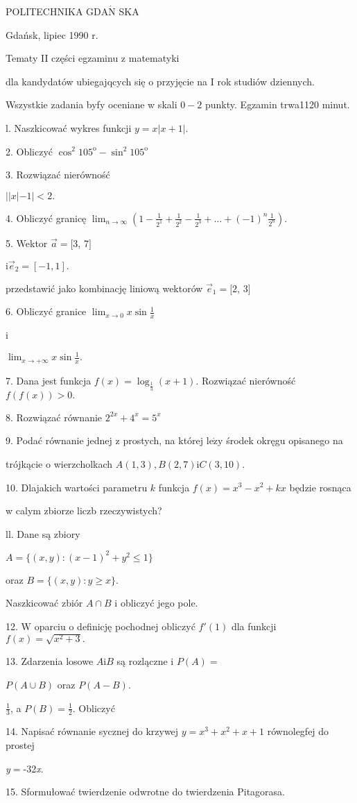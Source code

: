\documentclass[a4paper,12pt]{article}
\begin{document}
POLITECHNIKA $\mathrm{G}\mathrm{D}\mathrm{A}\acute{\mathrm{N}}$ SKA

Gdańsk, lipiec 1990 r.

Tematy II części egzaminu z matematyki

dla kandydatów ubiegajqcych się o przyjęcie na I rok studiów dziennych.

Wszystkie zadania byfy oceniane w skali $0-2$ punkty. Egzamin trwa1120 minut.

l. Naszkicować wykres funkcji $y=x|x+1|.$

2. Obliczyć $\cos^{2}105^{\mathrm{o}}-\sin^{2}105^{\mathrm{o}}$

3. Rozwiązać nierówność

$||x|-1|<2.$

4. Obliczyć granicę $\displaystyle \lim_{n\rightarrow\infty}(1-\frac{1}{2^{1}}+\frac{1}{2^{2}}-\frac{1}{2^{3}}+\ldots+(-1)^{n}\frac{1}{2^{n}}).$

5. Wektor $\vec{a}=[3$, 7$]$

$\mathrm{i}\vec{e}_{2}=[-1,1].$

przedstawić jako kombinację liniową wektorów $\vec{e}_{1}=[2$, 3$]$

6. Obliczyć granice $\displaystyle \lim_{x\rightarrow 0}x\sin\frac{1}{x}$

i

$\displaystyle \lim_{x\rightarrow+\infty}x\sin\frac{1}{x}.$

7. Dana jest funkcja $f(x)=\log_{\frac{1}{3}}(x+1)$. Rozwiązać nierówność $f(f(x))>0.$

8. Rozwiązać równanie $2^{2x}+4^{x}=5^{x}$

9. Podać równanie jednej z prostych, na której $\mathrm{l}\mathrm{e}\dot{\mathrm{z}}\mathrm{y}$ środek okręgu opisanego na

trójkącie o wierzcholkach $A(1,3), B(2,7)\mathrm{i}C(3,10).$

10. Dlajakich wartości parametru $k$ funkcja $f(x)=x^{3}-x^{2}+kx$ będzie rosnąca

w calym zbiorze liczb rzeczywistych?

ll. Dane są zbiory

$A=\{(x,y):(x-1)^{2}+y^{2}\leq 1\}$

oraz $B=\{(x,y):y\geq x\}.$

Naszkicować zbiór $A\cap B$ i obliczyć jego pole.

12. $\mathrm{W}$ oparciu o definicję pochodnej obliczyć $f'(1)$ dla funkcji $f(x)=\sqrt{x^{2}+3}.$

13. Zdarzenia losowe $A \mathrm{i} B$ są rozlączne i $P(A) =$

$P(A\cup B)$ oraz $P(A-B).$

$\displaystyle \frac{1}{3}$, a $P(B) = \displaystyle \frac{1}{2}$. Obliczyć

14. Napisać równanie sycznej do krzywej $y=x^{3}+x^{2}+x+1$ równolegfej do prostej

{\it y}$=$-32{\it x}.

15. Sformułować twierdzenie odwrotne do twierdzenia Pitagorasa.
\end{document}
